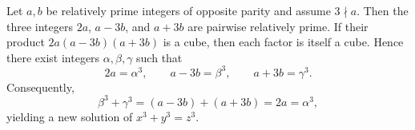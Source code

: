 Let $a, b$ be relatively prime integers of opposite parity and assume $3 \nmid a$. Then the three integers $2a$, $a - 3b$, and $a + 3b$ are pairwise relatively prime. If their product $2a(a - 3b)(a + 3b)$ is a cube, then each factor is itself a cube. Hence there exist integers $\alpha, \beta, \gamma$ such that
$$2a = \alpha^3, \qquad a - 3b = \beta^3, \qquad a + 3b = \gamma^3.$$
Consequently,
$$\beta^3 + \gamma^3 = (a - 3b) + (a + 3b) = 2a = \alpha^3,$$
yielding a new solution of $x^3 + y^3 = z^3$.
